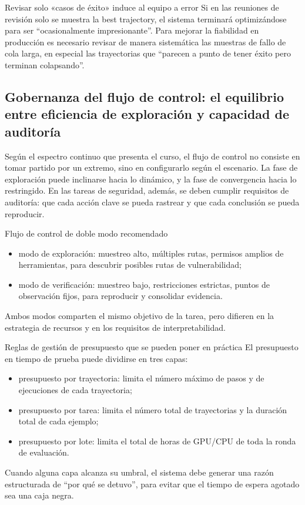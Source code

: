 \begin{warningbox}{Revisar solo «casos de éxito» induce al equipo a error}
Si en las reuniones de revisión solo se muestra la best trajectory, el sistema terminará optimizándose para ser ``ocasionalmente impresionante''. Para mejorar la fiabilidad en producción es necesario revisar de manera sistemática las muestras de fallo de cola larga, en especial las trayectorias que ``parecen a punto de tener éxito pero terminan colapsando''.
\end{warningbox}

\subsection{Gobernanza del flujo de control: el equilibrio entre eficiencia de exploración y capacidad de auditoría}
Según el espectro continuo que presenta el curso, el flujo de control no consiste en tomar partido por un extremo, sino en configurarlo según el escenario. La fase de exploración puede inclinarse hacia lo dinámico, y la fase de convergencia hacia lo restringido. En las tareas de seguridad, además, se deben cumplir requisitos de auditoría: que cada acción clave se pueda rastrear y que cada conclusión se pueda reproducir.

\begin{importantbox}{Flujo de control de doble modo recomendado}
\begin{itemize}
    \item modo de exploración: muestreo alto, múltiples rutas, permisos amplios de herramientas, para descubrir posibles rutas de vulnerabilidad;
    \item modo de verificación: muestreo bajo, restricciones estrictas, puntos de observación fijos, para reproducir y consolidar evidencia.
\end{itemize}
Ambos modos comparten el mismo objetivo de la tarea, pero difieren en la estrategia de recursos y en los requisitos de interpretabilidad.
\end{importantbox}

\begin{knowledgebox}{Reglas de gestión de presupuesto que se pueden poner en práctica}
El presupuesto en tiempo de prueba puede dividirse en tres capas:
\begin{itemize}
    \item presupuesto por trayectoria: limita el número máximo de pasos y de ejecuciones de cada trayectoria;
    \item presupuesto por tarea: limita el número total de trayectorias y la duración total de cada ejemplo;
    \item presupuesto por lote: limita el total de horas de GPU/CPU de toda la ronda de evaluación.
\end{itemize}
Cuando alguna capa alcanza su umbral, el sistema debe generar una razón estructurada de ``por qué se detuvo'', para evitar que el tiempo de espera agotado sea una caja negra.
\end{knowledgebox}

